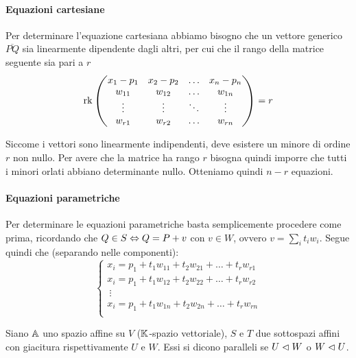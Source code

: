 \documentclass{article}     %
\begin{document}
\begin{ex}[Generalizziano l'esempio seguente considerando lo spazio affine $\A$ di dimensione $n$ con il sistema di riferimento canonico e scriviamo le equazioni del sottospazio affine $S$ passante per $P=(p_1, \dots, p_n)$ con giacitura $W=\langle w_1,\dots, w_r\rangle$, dove $w_i=(w_{i1},\dots,w_{in})$ e i $w_i$ sono linearmente indipendenti.]
\paragraph*{Equazioni cartesiane}
Per determinare l'equazione cartesiana abbiamo bisogno che un vettore generico $\overline{PQ}$ sia linearmente dipendente dagli altri, per cui che il rango della matrice seguente sia pari a $r$
\[\operatorname{rk}\begin{pmatrix}
    x_1-p_1&x_2-p_2&\dots&x_n-p_n\\
    w_{11}&w_{12} & \dots & w_{1n}\\
    \vdots&\vdots&\ddots&\vdots\\
    w_{r1}&w_{r2} & \dots & w_{rn}\\
\end{pmatrix}=r\]

Siccome i vettori sono linearmente indipendenti, deve esistere un minore di ordine $r$ non nullo. Per avere che la matrice ha rango $r$ bisogna quindi imporre che tutti i minori orlati abbiano determinante nullo. Otteniamo quindi $n-r$ equazioni.
\paragraph*{Equazioni parametriche}
Per determinare le equazioni parametriche basta semplicemente procedere come prima, ricordando che $Q\in S \Leftrightarrow Q=P+v $ con $v\in W$, ovvero $v=\sum_it_iw_i$. Segue quindi che (separando nelle componenti):
\[\begin{cases}
    x_i=p_1+t_1w_{11}+t_2w_{21}+\dots+t_rw_{r1}\\
    x_i=p_1+t_1w_{12}+t_2w_{22}+\dots+t_rw_{r2}\\
    \ \vdots\\
    x_i=p_1+t_1w_{1n}+t_2w_{2n}+\dots+t_rw_{rn}\\
\end{cases}\]
\end{ex}

\begin{boxdef}
    Siano $\A$ uno spazio affine su $V$ ($\mathbb{K}$-spazio vettoriale), $S$ e $T$ due sottospazi affini con giacitura rispettivamente $U$ e $W$. Essi si dicono paralleli se $U\vartriangleleft W$ o $W\vartriangleleft U$.
\end{boxdef}
\end{document}
